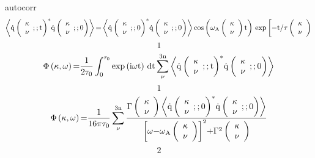 \documentclass{article}
\begin{document}
\noindent autocorr
\[\left\langle {\dot{{\rm q}}\left( \begin{array}{c}
{\mathbf \kappa } \\ 
\nu  \end{array}
;;{\rm t}\right)}^{{\rm *}}\dot{{\rm q}}\left( \begin{array}{c}
{\mathbf \kappa } \\ 
\nu  \end{array}
;;{\rm 0}\right)\right\rangle {\rm =}\left\langle {\dot{{\rm q}}\left( \begin{array}{c}
{\mathbf \kappa } \\ 
\nu  \end{array}
;;{\rm 0}\right)}^{{\rm *}}\dot{{\rm q}}\left( \begin{array}{c}
{\mathbf \kappa } \\ 
\nu  \end{array}
;;{\rm 0}\right)\right\rangle {\cos  \left({\omega }_{{\rm A}}\left( \begin{array}{c}
{\mathbf \kappa } \\ 
\nu  \end{array}
\right){\rm t}\right)\ }{\rm exp}\left[{\rm -}{{\rm t}}/{\tau \left( \begin{array}{c}
{\mathbf \kappa } \\ 
\nu  \end{array}
\right)}\right.\] 
\[1\] 
\[\Phi \left({\mathbf \kappa },\omega \right){\rm =}\frac{{\rm 1}}{{\rm 2}{\tau }_0}\int^{{\tau }_0}_0{{\exp  \left({\rm i}\omega {\rm t}\right)\ }{\rm dt}\sum^{{\rm 3n}}_{\nu }{\left\langle {\dot{{\rm q}}\left( \begin{array}{c}
{\mathbf \kappa } \\ 
\nu  \end{array}
;;{\rm t}\right)}^{{\rm *}}\dot{{\rm q}}\left( \begin{array}{c}
{\mathbf \kappa } \\ 
\nu  \end{array}
;;{\rm 0}\right)\right\rangle }}\] 
\[1\] 
\[\Phi \left({\mathbf \kappa },\omega \right){\rm =}\frac{{\rm 1}}{{\rm 16}\pi {\tau }_0}\sum^{{\rm 3n}}_{\nu }{\frac{\Gamma \left( \begin{array}{c}
{\mathbf \kappa } \\ 
\nu  \end{array}
\right)\left\langle {\dot{{\rm q}}\left( \begin{array}{c}
{\mathbf \kappa } \\ 
\nu  \end{array}
;;{\rm 0}\right)}^{{\rm *}}\dot{{\rm q}}\left( \begin{array}{c}
{\mathbf \kappa } \\ 
\nu  \end{array}
;;{\rm 0}\right)\right\rangle }{{\left[{\omega {\rm -}\omega }_{{\rm A}}\left( \begin{array}{c}
{\mathbf \kappa } \\ 
\nu  \end{array}
\right)\right]}^{{\rm 2}}{\rm +}{\Gamma }^{{\rm 2}}\left( \begin{array}{c}
{\mathbf \kappa } \\ 
\nu  \end{array}
\right)}}\] 
\[2\] 
\end{document}
